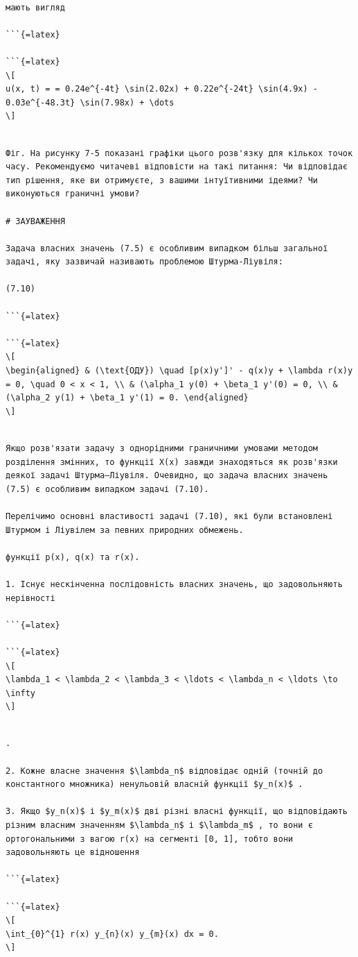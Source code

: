 \documentclass[
  ukrainian,
]{article}
\begin{document}
\begin{verbatim}

мають вигляд

```{=latex}

```{=latex}
\[
u(x, t) = = 0.24e^{-4t} \sin(2.02x) + 0.22e^{-24t} \sin(4.9x) - 0.03e^{-48.3t} \sin(7.98x) + \dots
\]
\end{verbatim}

\begin{verbatim}

Фіг. На рисунку 7-5 показані графіки цього розв'язку для кількох точок часу. Рекомендуємо читачеві відповісти на такі питання: Чи відповідає тип рішення, яке ви отримуєте, з вашими інтуїтивними ідеями? Чи виконуються граничні умови?

# ЗАУВАЖЕННЯ

Задача власних значень (7.5) є особливим випадком більш загальної задачі, яку зазвичай називають проблемою Штурма-Ліувіля:

(7.10)

```{=latex}

```{=latex}
\[
\begin{aligned} & (\text{ОДУ}) \quad [p(x)y']' - q(x)y + \lambda r(x)y = 0, \quad 0 < x < 1, \\ & (\alpha_1 y(0) + \beta_1 y'(0) = 0, \\ & (\alpha_2 y(1) + \beta_1 y'(1) = 0. \end{aligned}
\]
\end{verbatim}

\begin{verbatim}

Якщо розв'язати задачу з однорідними граничними умовами методом розділення змінних, то функції X(x) завжди знаходяться як розв'язки деякої задачі Штурма–Ліувіля. Очевидно, що задача власних значень (7.5) є особливим випадком задачі (7.10).

Перелічимо основні властивості задачі (7.10), які були встановлені Штурмом і Ліувілем за певних природних обмежень.

функції p(x), q(x) та r(x).

1. Існує нескінченна послідовність власних значень, що задовольняють нерівності

```{=latex}

```{=latex}
\[
\lambda_1 < \lambda_2 < \lambda_3 < \ldots < \lambda_n < \ldots \to \infty
\]
\end{verbatim}

\begin{verbatim}

.

2. Кожне власне значення $\lambda_n$ відповідає одній (точній до константного множника) ненульовій власній функції $y_n(x)$ .

3. Якщо $y_n(x)$ і $y_m(x)$ дві різні власні функції, що відповідають різним власним значенням $\lambda_n$ і $\lambda_m$ , то вони є ортогональними з вагою r(x) на сегменті [0, 1], тобто вони задовольняють це відношення

```{=latex}

```{=latex}
\[
\int_{0}^{1} r(x) y_{n}(x) y_{m}(x) dx = 0.
\]
\end{verbatim}
\end{document}
